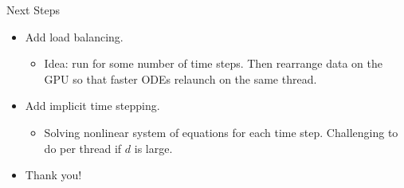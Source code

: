 \begin{frame}{Next Steps}
\begin{itemize}
    \item Add load balancing.
    \begin{itemize}
        \item Idea: run for some number of time steps. Then rearrange data on the GPU so that faster ODEs relaunch on the same thread.
    \end{itemize}
    
    \item Add implicit time stepping.
    \begin{itemize}
        \item Solving nonlinear system of equations for each time step. Challenging to do per thread if $d$ is large.
    \end{itemize}

    \item Thank you!
\end{itemize}
\end{frame}
